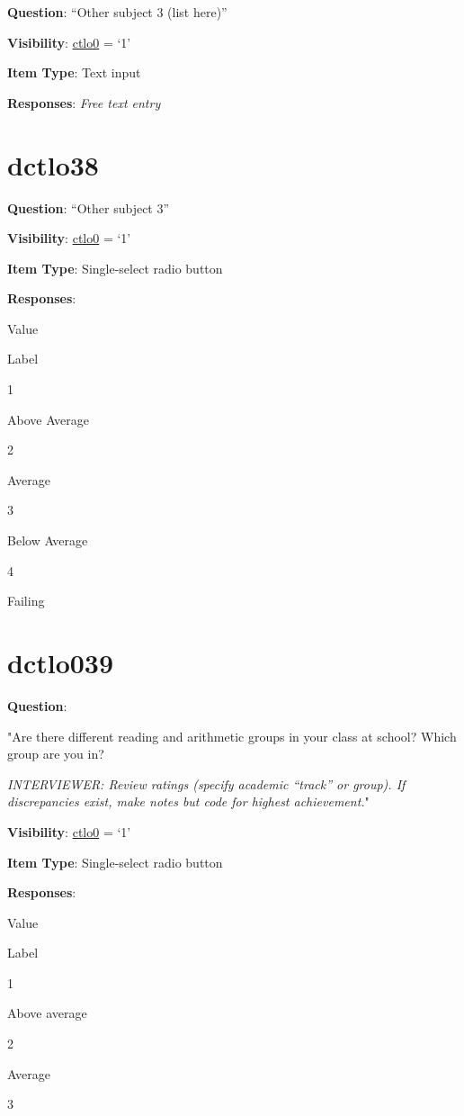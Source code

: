 \documentclass[]{book}
\begin{document}
\textbf{Question}: ``Other subject 3 (list here)''

\textbf{Visibility}: \protect\hyperlink{ctlo0}{ctlo0} = `1'

\textbf{Item Type}: Text input

\textbf{Responses}: \emph{Free text entry}

\hypertarget{dctlo38}{%
\section{dctlo38}\label{dctlo38}}

\textbf{Question}: ``Other subject 3''

\textbf{Visibility}: \protect\hyperlink{ctlo0}{ctlo0} = `1'

\textbf{Item Type}: Single-select radio button

\textbf{Responses}:

Value

Label

1

Above Average

2

Average

3

Below Average

4

Failing

\hypertarget{dctlo039}{%
\section{dctlo039}\label{dctlo039}}

\textbf{Question}:

"Are there different reading and arithmetic groups in your class at school? Which group are you in?

\emph{INTERVIEWER: Review ratings (specify academic ``track'' or group). If discrepancies exist, make notes but code for highest achievement.}"

\textbf{Visibility}: \protect\hyperlink{ctlo0}{ctlo0} = `1'

\textbf{Item Type}: Single-select radio button

\textbf{Responses}:

Value

Label

1

Above average

2

Average

3
\end{document}
